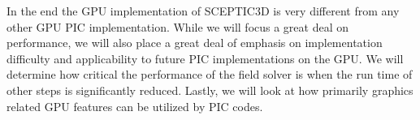 

In the end the GPU implementation of SCEPTIC3D is very different from any other GPU PIC implementation. While we will focus a great deal on performance, we will also place a great deal of emphasis on implementation difficulty and applicability to future PIC implementations on the GPU. We will determine how critical the performance of the field solver is when the run time of other steps is significantly reduced. Lastly, we will look at how primarily graphics related GPU features can be utilized by PIC codes. 














